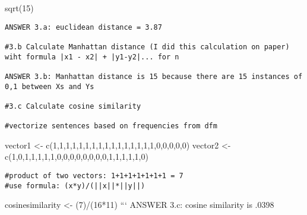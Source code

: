 \documentclass[
]{article}
\begin{document}
sqrt(15)

\begin{verbatim}
ANSWER 3.a: euclidean distance = 3.87

#3.b Calculate Manhattan distance (I did this calculation on paper) wiht formula |x1 - x2| + |y1-y2|... for n

ANSWER 3.b: Manhattan distance is 15 because there are 15 instances of 0,1 between Xs and Ys

#3.c Calculate cosine similarity 

#vectorize sentences based on frequencies from dfm 
\end{verbatim}

vector1 \textless- c(1,1,1,1,1,1,1,1,1,1,1,1,1,1,1,1,0,0,0,0,0) vector2
\textless- c(1,0,1,1,1,1,1,0,0,0,0,0,0,0,0,1,1,1,1,1,0)

\begin{verbatim}
#product of two vectors: 1+1+1+1+1+1+1 = 7
#use formula: (x*y)/(||x||*||y||)
\end{verbatim}

cosinesimilarity \textless- (7)/(16*11) ``` ANSWER 3.c: cosine
similarity is .0398
\end{document}
